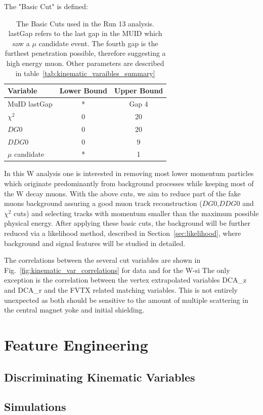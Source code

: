 The "Basic Cut" is defined:
\begin{table}
	\begin{centering}
		\begin{tabular}{l c c}
			\toprule
			\textbf{Variable} & \textbf{Lower Bound} & \textbf{Upper Bound} \\
			\midrule
			MuID lastGap & * & Gap 4 \\ 
			$\chi^2$ & 0 & 20 \\
			$DG0$ & 0 & 20 \\
			$DDG0$ & 0 & 9 \\
			$\mu$ candidate & * & 1 \\
			\bottomrule
		\end{tabular}
		\caption{ The Basic Cuts used in the Run 13 analysis. lastGap refers to the
			last gap in the MUID which saw a $\mu$ candidate event. The fourth gap is
			the furthest penetration possible, therefore suggesting a high energy muon.
		Other parameters are described in table~\ref{tab:kinematic_varaibles_summary}}
		\label{tab:basic_cut}
	\end{centering}
\end{table}



In this W analysis one is interested in removing most lower momentum particles
which originate predominantly from background processes while keeping most of
the W decay muons. With the above cuts, we aim to reduce part of the fake muons
background assuring a good muon track reconstruction ($DG0$,$DDG0$ and $\chi^2$
cuts) and selecting tracks with momentum smaller than the maximum possible
physical energy. After applying these basic cuts, the background will be further
reduced via a likelihood method, described in Section~\ref{sec:likelihood}, where
background and signal features will be studied in detailed.

The correlations between the several cut variables are shown in
Fig.~\ref{fig:kinematic_var_correlations} for data and for the W-si The only
exception is the correlation between the vertex extrapolated variables DCA\_z
and DCA\_r and the FVTX related matching variables. This is not entirely
unexpected as both should be sensitive to the amount of multiple scattering in
the central magnet yoke and initial shielding.

\section{Feature Engineering}
\subsection{Discriminating Kinematic Variables}
\subsection{Simulations}
